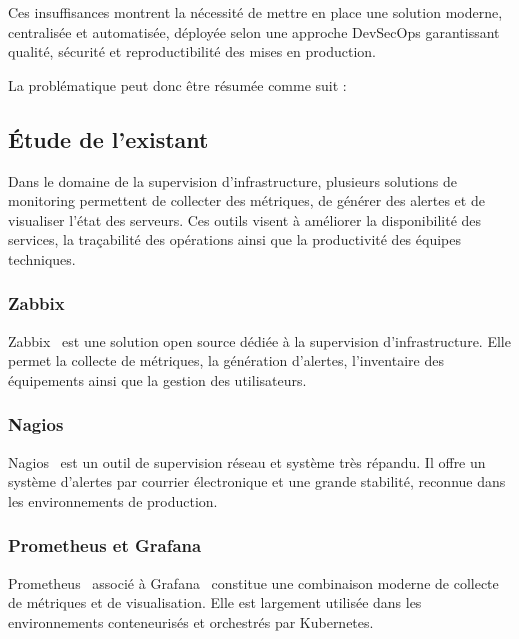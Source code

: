 Ces insuffisances montrent la nécessité de mettre en place une solution moderne,
centralisée et automatisée, déployée selon une approche DevSecOps garantissant qualité,
sécurité et reproductibilité des mises en production.

La problématique peut donc être résumée comme suit :

\begin{center}
\end{center}

\subsection{Étude de l'existant}
Dans le domaine de la supervision d'infrastructure, plusieurs solutions de monitoring
permettent de collecter des métriques, de générer des alertes et de visualiser l'état
des serveurs. Ces outils visent à améliorer la disponibilité des services, la
traçabilité des opérations ainsi que la productivité des équipes techniques.

\subsubsection*{Zabbix}
Zabbix~\cite{zabbix} est une solution open source dédiée à la supervision
d'infrastructure. Elle permet la collecte de métriques, la génération d'alertes,
l'inventaire des équipements ainsi que la gestion des utilisateurs.

\subsubsection*{Nagios}
Nagios~\cite{nagios} est un outil de supervision réseau et système très répandu. Il
offre un système d'alertes par courrier électronique et une grande stabilité, reconnue
dans les environnements de production.

\subsubsection*{Prometheus et Grafana}
Prometheus~\cite{prometheus} associé à Grafana~\cite{grafana} constitue une combinaison
moderne de collecte de métriques et de visualisation. Elle est largement utilisée dans
les environnements conteneurisés et orchestrés par Kubernetes.

